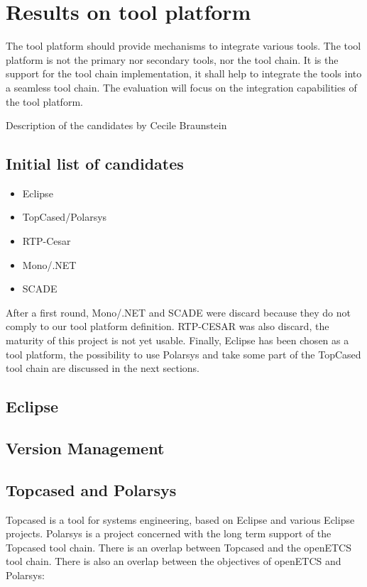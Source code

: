
\chapter{Results on tool platform}
The tool platform should provide mechanisms to integrate various
tools. The tool platform is not the primary nor secondary tools, nor
the tool chain. It is the support for the tool chain implementation,
it shall help to integrate the tools into a seamless tool chain.
The evaluation will focus on the integration capabilities of the tool platform.
\begin{todo_comment}
Description of the candidates by Cecile Braunstein
\end{todo_comment}

\section{Initial list of candidates}
\begin{itemize}
\item  Eclipse 
\item  TopCased/Polarsys
\item RTP-Cesar
\item Mono/.NET 
\item SCADE
\end{itemize}

After a first round, Mono/.NET and  SCADE were discard because they do
not comply to our tool platform definition.
RTP-CESAR was also discard, the maturity of this project is not yet
usable. Finally, Eclipse has been chosen as a tool platform, the possibility
to use Polarsys and take some part of the TopCased tool chain are
discussed in the next sections.

\section{Eclipse}

\section{Version Management}

\section{Topcased and Polarsys}

Topcased is a tool for systems engineering, based on Eclipse and various Eclipse projects.  Polarsys is a project concerned with the long term support of the Topcased tool chain.  There is an overlap between Topcased and the openETCS tool chain.  There is also an overlap between the objectives of openETCS and Polarsys:

